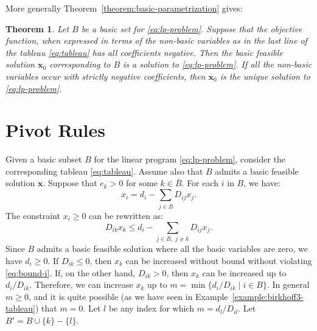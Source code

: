 \documentclass{amsbook}
\newcommand{\xx}{\mathbf x}
\newtheorem{theorem}{Theorem}[section]
\theoremstyle{definition}
\theoremstyle{remark}
\begin{document}
More generally Theorem~\ref{theorem:basic-parametrization} gives:
\begin{theorem}
  Let $B$ be a basic set for \eqref{eq:lp-problem}.
  Suppose that the objective function, when expressed in terms of the non-basic variables as in the last line of the tableau \eqref{eq:tableau} has all coefficients negative.
  Then the basic feasible solution $\xx_0$ corresponding to $B$ is a solution to \eqref{eq:lp-problem}.
  If all the non-basic variables occur with strictly negative coefficients, then $\xx_0$ is the unique solution to \eqref{eq:lp-problem}.
\end{theorem}

\section{Pivot Rules}
\label{sec:pivot-rules}

Given a basic subset $B$ for the linear program \eqref{eq:lp-problem}, consider the corresponding tableau \eqref{eq:tableau}.
Assume also that $B$ admits a basic feasible solution $\xx$.
Suppose that $e_k>0$ for some $k\in \bar B$.
For each $i$ in $B$, we have:
\begin{equation}
  \label{eq:bound-i}
  x_i = d_i - \sum_{j\in \bar B} D_{ij}x_j.
\end{equation}
The constraint $x_i\geq 0$ can be rewritten as:
\begin{displaymath}
  D_{ik}x_k \leq d_i - \sum_{j\in \bar B,\;j\neq k} D_{ij}x_j.
\end{displaymath}
Since $B$ admits a basic feasible solution where all the basic variables are zero, we have $d_i\geq 0$.
If $D_{ik}\leq 0$, then $x_k$ can be increased without bound without violating \eqref{eq:bound-i}.
If, on the other hand, $D_{ik}>0$, then $x_k$ can be increased up to $d_i/D_{ik}$.
Therefore, we can increase $x_k$ up to $m=\min\{d_i/D_{ik}\mid i\in B\}$.
In general $m\geq 0$, and it is quite possible (as we have seen in Example~\ref{example:birkhoff3-tableau}) that $m=0$.
Let $l$ be any index for which $m=d_l/D_{il}$.
Let $B'=B\cup\{k\}-\{l\}$.
\end{document}
